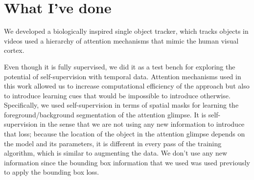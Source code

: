 \section{What I've done}
\label{sec:done}

    We developed a biologically inspired single object tracker, which tracks objects in videos used a hierarchy of attention mechanisms that mimic the human visual cortex.
    
    Even though it is fully supervised, we did it as a test bench for exploring the potential of self-supervision with temporal data. Attention mechanisms used in this work allowed us to increase computational efficiency of the approach but also to introduce learning cues that would be impossible to introduce otherwise. Specifically, we used self-supervision in terms of spatial masks for learning the foreground/background segmentation of the attention glimpse. It is self-supervision in the sense that we are not using any new information to introduce that loss; because the location of the object in the attention glimpse depends on the model and its parameters, it is different in every pass of the training algorithm, which is similar to augmenting the data. We don't use any new information since the bounding box information that we used was used previously to apply the bounding box loss.